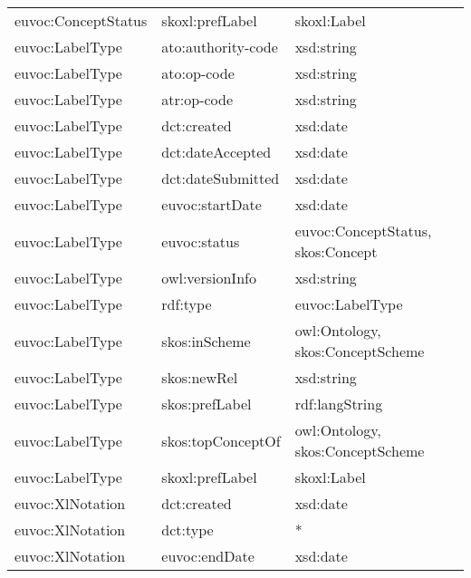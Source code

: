 \documentclass[10pt,a4paper,titlepage,final]{article}
\begin{document}
\begin{longtable}{lll}
 euvoc:ConceptStatus &         skoxl:prefLabel &                                        skoxl:Label \\
     euvoc:LabelType &      ato:authority-code &                                         xsd:string \\
     euvoc:LabelType &             ato:op-code &                                         xsd:string \\
     euvoc:LabelType &             atr:op-code &                                         xsd:string \\
     euvoc:LabelType &             dct:created &                                           xsd:date \\
     euvoc:LabelType &        dct:dateAccepted &                                           xsd:date \\
     euvoc:LabelType &       dct:dateSubmitted &                                           xsd:date \\
     euvoc:LabelType &         euvoc:startDate &                                           xsd:date \\
     euvoc:LabelType &            euvoc:status &                  euvoc:ConceptStatus, skos:Concept \\
     euvoc:LabelType &         owl:versionInfo &                                         xsd:string \\
     euvoc:LabelType &                rdf:type &                                    euvoc:LabelType \\
     euvoc:LabelType &           skos:inScheme &                   owl:Ontology, skos:ConceptScheme \\
     euvoc:LabelType &             skos:newRel &                                         xsd:string \\
     euvoc:LabelType &          skos:prefLabel &                                     rdf:langString \\
     euvoc:LabelType &       skos:topConceptOf &                   owl:Ontology, skos:ConceptScheme \\
     euvoc:LabelType &         skoxl:prefLabel &                                        skoxl:Label \\
    euvoc:XlNotation &             dct:created &                                           xsd:date \\
    euvoc:XlNotation &                dct:type &                                                  * \\
    euvoc:XlNotation &           euvoc:endDate &                                           xsd:date \\

\end{longtable}
\end{document}
